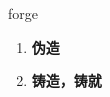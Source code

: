 
\begin{frame}
{\huge forge}
\begin{center}
\begin{enumerate}\Large
  \item \textbf{伪造}
  \item \textbf{铸造，铸就}
\end{enumerate}
\end{center}
\end{frame}
